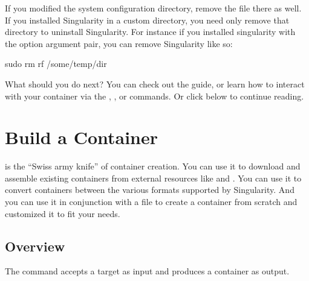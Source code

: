 \documentclass[letterpaper,10pt,english]{sphinxmanual}
\begin{document}
If you modified the system configuration directory, remove the  file
there as well.
If you installed Singularity in a custom directory, you need only
remove that directory to uninstall Singularity. For instance if you
installed singularity with the  option argument pair, you can remove
Singularity like so:

%
\begin{sphinxVerbatim}[commandchars=\\\{\}]
\PYGZdl{} sudo rm \PYGZhy{}rf /some/temp/dir
\end{sphinxVerbatim}

What should you do next? You can check out the  guide, or learn how to
interact with your container via the  ,  , or  commands. Or click 
below to continue reading.


\chapter{Build a Container}
\label{\detokenize{build_a_container:build-a-container}}\label{\detokenize{build_a_container::doc}}\label{\detokenize{build_a_container:sec-buildcontainer}}
 is the “Swiss army knife” of container creation. You can use it to
download and assemble existing containers from external resources like
 and . You can use it to convert
containers between the various formats supported by Singularity. And you
can use it in conjunction with a  file to
create a container from scratch and customized it to fit your needs.


\section{Overview}
\label{\detokenize{build_a_container:overview}}
The  command accepts a target as input and produces a container as output.
\end{document}

